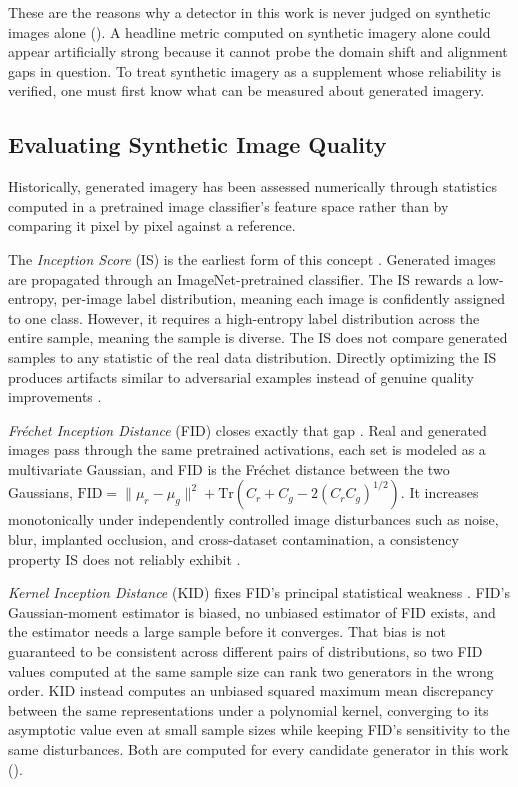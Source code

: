 These are the reasons why a detector in this work is never judged on synthetic images alone (). A headline metric computed on synthetic imagery alone could appear artificially strong because it cannot probe the domain shift and alignment gaps in question. To treat synthetic imagery as a supplement whose reliability is verified, one must first know what can be measured about generated imagery.

\subsection{Evaluating Synthetic Image Quality}\label{sec:lit_synthetic_evaluation}

Historically, generated imagery has been assessed numerically through statistics computed in a pretrained image classifier's feature space rather than by comparing it pixel by pixel against a reference.

The \textit{Inception Score} (IS) is the earliest form of this concept \cite{salimansImprovedTechniquesTraining2016}. Generated images are propagated through an ImageNet-pretrained classifier. The IS rewards a low-entropy, per-image label distribution, meaning each image is confidently assigned to one class. However, it requires a high-entropy label distribution across the entire sample, meaning the sample is diverse. The IS does not compare generated samples to any statistic of the real data distribution. Directly optimizing the IS produces artifacts similar to adversarial examples instead of genuine quality improvements \cite{salimansImprovedTechniquesTraining2016}.

\textit{Fréchet Inception Distance} (FID) closes exactly that gap \cite{heuselGANsTrainedTwo2018}. Real and generated images pass through the same pretrained activations, each set is modeled as a multivariate Gaussian, and FID is the Fréchet distance between the two Gaussians, $\mathrm{FID} = \|\mu_r - \mu_g\|^2 + \mathrm{Tr}(C_r + C_g - 2(C_r C_g)^{1/2})$. It increases monotonically under independently controlled image disturbances such as noise, blur, implanted occlusion, and cross-dataset contamination, a consistency property IS does not reliably exhibit \cite{heuselGANsTrainedTwo2018}.

\textit{Kernel Inception Distance} (KID) fixes FID's principal statistical weakness \cite{binkowskiDemystifyingMMDGANs2021}. FID's Gaussian-moment estimator is biased, no unbiased estimator of FID exists, and the estimator needs a large sample before it converges. That bias is not guaranteed to be consistent across different pairs of distributions, so two FID values computed at the same sample size can rank two generators in the wrong order. KID instead computes an unbiased squared maximum mean discrepancy between the same representations under a polynomial kernel, converging to its asymptotic value even at small sample sizes while keeping FID's sensitivity to the same disturbances. Both are computed for every candidate generator in this work ().

